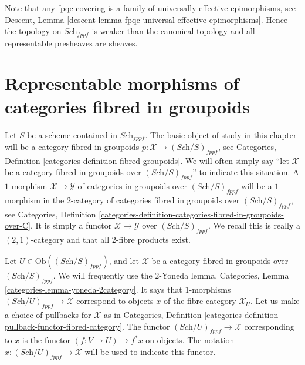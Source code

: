 \medskip\noindent
Note that any fpqc covering is a family of universally effective
epimorphisms, see
Descent, Lemma \ref{descent-lemma-fpqc-universal-effective-epimorphisms}.
Hence the topology on $\textit{Sch}_{fppf}$
is weaker than the canonical topology and all representable presheaves
are sheaves.
















\section{Representable morphisms of categories fibred in groupoids}
\label{section-representable}

\noindent
Let $S$ be a scheme contained in $\textit{Sch}_{fppf}$.
The basic object of study in this chapter will be a
category fibred in groupoids
$p : \mathcal{X} \to (\textit{Sch}/S)_{fppf}$, see
Categories, Definition \ref{categories-definition-fibred-groupoids}.
We will often simply say ``let $\mathcal{X}$ be a category fibred
in groupoids over $(\textit{Sch}/S)_{fppf}$'' to indicate
this situation. A $1$-morphism $\mathcal{X} \to \mathcal{Y}$ of categories
in groupoids over $(\textit{Sch}/S)_{fppf}$ will be a $1$-morphism
in the $2$-category of categories fibred in groupoids over
$(\textit{Sch}/S)_{fppf}$, see Categories,
Definition \ref{categories-definition-categories-fibred-in-groupoids-over-C}.
It is simply a functor $\mathcal{X} \to \mathcal{Y}$ over
$(\textit{Sch}/S)_{fppf}$.
We recall this is really a $(2, 1)$-category and that all $2$-fibre products
exist.

\medskip\noindent
Let $U \in \text{Ob}((\textit{Sch}/S)_{fppf})$, and let $\mathcal{X}$ be a
category fibred in groupoids over $(\textit{Sch}/S)_{fppf}$.
We will frequently use the $2$-Yoneda lemma, Categories,
Lemma \ref{categories-lemma-yoneda-2category}.
It says that $1$-morphisms $(\textit{Sch}/U)_{fppf} \to \mathcal{X}$
correspond to objects $x$ of the fibre category $\mathcal{X}_U$.
Let us make a choice of pullbacks for $\mathcal{X}$ as in Categories,
Definition \ref{categories-definition-pullback-functor-fibred-category}.
The functor $(\textit{Sch}/U)_{fppf} \to \mathcal{X}$ corresponding to $x$
is the functor $(f : V \to U) \mapsto f^*x$ on objects. The notation
$x : (\textit{Sch}/U)_{fppf} \to \mathcal{X}$ will be used to indicate this
functor.

